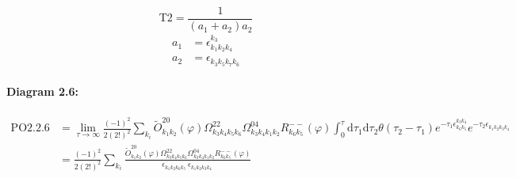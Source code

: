 \documentclass[10pt,a4paper]{article}
\begin{document}
\begin{equation}
\text{T}2 = \frac{1}{(a_1+ a_2)a_2}\end{equation}
\begin{align*}
a_1 &= \epsilon^{k_{3}}_{k_{1}k_{2}k_{4}}\\
a_2 &= \epsilon^{}_{k_{3}k_{5}k_{7}k_{6}}
\end{align*}
\paragraph{Diagram 2.6:}
\begin{align}
\text{PO}2.2.6
&= \lim\limits_{\tau \to \infty}\frac{(-1)^2 }{2(2!)^2}\sum_{k_i}\tilde{O}^{20}_{k_{1}k_{2}} (\varphi) \Omega^{22}_{k_{3}k_{4}k_{5}k_{6}} \Omega^{04}_{k_{3}k_{4}k_{1}k_{2}} R^{--}_{k_{6}k_{5}}(\varphi)\int_{0}^{\tau}\mathrm{d}\tau_1\mathrm{d}\tau_2\theta(\tau_2-\tau_1) e^{-\tau_1 \epsilon^{k_{3}k_{4}}_{k_{6}k_{5}}}e^{-\tau_2 \epsilon^{}_{k_{1}k_{2}k_{3}k_{4}}}
 \nonumber \\
&= \frac{(-1)^2 }{2(2!)^2}\sum_{k_i}\frac{\tilde{O}^{20}_{k_{1}k_{2}} (\varphi) \Omega^{22}_{k_{3}k_{4}k_{5}k_{6}} \Omega^{04}_{k_{3}k_{4}k_{1}k_{2}} R^{--}_{k_{6}k_{5}}(\varphi)}{\epsilon^{}_{k_{1}k_{2}k_{6}k_{5}}\ \epsilon^{}_{k_{1}k_{2}k_{3}k_{4}}\ } 
\end{align}
\end{document}
